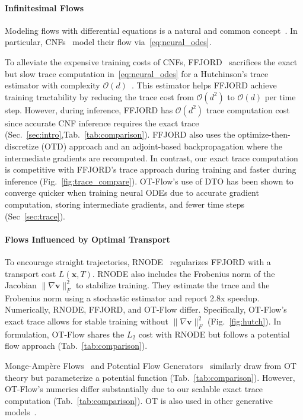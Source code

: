 \documentclass[letterpaper]{article}
\newcommand{\bfv}{\mathbf{v}}
\newcommand{\bfx}{\boldsymbol{x}}
\newcommand{\model}{OT-Flow} %
\newcommand{\bigO}{\ensuremath{\mathcal{O}}}
\begin{document}
	\paragraph{Infinitesimal Flows} 
	Modeling flows with differential equations is a natural and common concept~\cite{suykens1998,welling2011bayesian,neal2011mcmc,salimans2015markov}.
	In particular, CNFs~\cite{chen2017continuous,chen2018neural,grathwohl2019ffjord} model their flow via~\eqref{eq:neural_odes}.

	To alleviate the expensive training costs of CNFs, FFJORD~\cite{grathwohl2019ffjord} sacrifices the exact but slow trace computation in~\eqref{eq:neural_odes} for a Hutchinson's trace estimator with complexity $\bigO(d)$~\cite{hutchinson1990stochastic}. 
	This estimator helps FFJORD achieve training tractability by reducing the trace cost from $\bigO(d^2)$ to $\bigO(d)$ per time step.
	However, during inference, FFJORD has $\bigO(d^2)$ trace computation cost since accurate CNF inference requires the exact trace (Sec.~\ref{sec:intro},Tab.~\ref{tab:comparison}).
	FFJORD also uses the optimize-then-discretize (OTD) approach and an adjoint-based backpropagation where the intermediate gradients are recomputed.
	In contrast, our exact trace computation is competitive with FFJORD's trace approach during training and faster during inference (Fig.~\ref{fig:trace_compare}). 
	\model{}'s use of DTO has been shown to converge quicker when training neural ODEs due to accurate gradient computation, storing intermediate gradients, and fewer time steps~\cite{li2017maximum,gholami2019anode,onken2020do} (Sec~\ref{sec:trace}).

	
	\paragraph{Flows Influenced by Optimal Transport}
 	To encourage straight trajectories, RNODE~\cite{finlay2020train} regularizes FFJORD with a transport cost $L(\bfx,T)$. 
 	RNODE also includes the Frobenius norm of the Jacobian $\| \nabla \bfv \|_F^2$ to stabilize training. 
	They estimate the trace and the Frobenius norm using a stochastic estimator and report 2.8x speedup. 
	Numerically, RNODE, FFJORD, and \model{} differ. Specifically, \model{}'s exact trace allows for stable training without $\| \nabla \bfv \|_F^2$ (Fig.~\ref{fig:hutch}).
	In formulation, \model{} shares the $L_2$ cost with RNODE but follows a potential flow approach (Tab.~\ref{tab:comparison}).

	Monge-Ampère Flows~\cite{zhang2018monge} and Potential Flow Generators~\cite{yang2019} similarly draw from OT theory but parameterize a potential function (Tab.~\ref{tab:comparison}).
	However, \model{}'s numerics differ substantially due to our scalable exact trace computation (Tab.~\ref{tab:comparison}).
	OT is also used in other generative models~\cite{sanjabi2018,salimans2018improving,lei2018geometric,lin2019fluid,avraham2019parallel,tanaka2019discriminator}.
	
\end{document}
